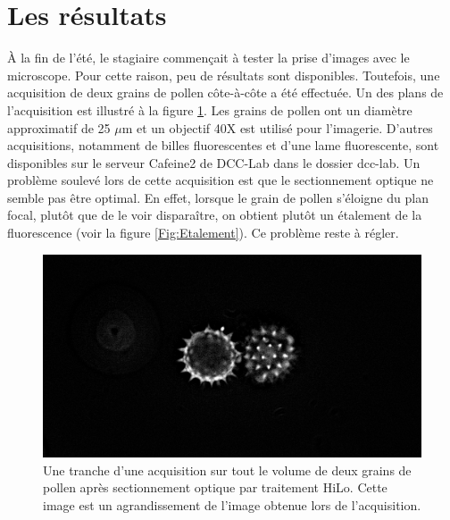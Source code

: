 \documentclass{article}       %
\begin{document}
\section{Les résultats}
\label{Results}

À la fin de l'été, le stagiaire commençait à tester la prise d'images avec le microscope. Pour cette raison, peu de résultats sont disponibles. Toutefois, une acquisition de deux grains de pollen côte-à-côte a été effectuée. Un des plans de l'acquisition est illustré à la figure \ref{Fig:Grains}. Les grains de pollen ont un diamètre approximatif de 25 $\mu$m et un objectif 40X est utilisé pour l'imagerie. D'autres acquisitions, notamment de billes fluorescentes et d'une lame fluorescente, sont disponibles sur le serveur Cafeine2 de DCC-Lab dans le dossier dcc-lab. Un problème soulevé lors de cette acquisition est que le sectionnement optique ne semble pas être optimal. En effet, lorsque le grain de pollen s'éloigne du plan focal, plutôt que de le voir disparaître, on obtient plutôt un étalement de la fluorescence (voir la figure \ref{Fig:Etalement}). Ce problème reste à régler.

\begin{figure}[H]
    \centering
    \includegraphics[scale=0.4]{fig/BeauPollen.PNG}
    \caption{Une tranche d'une acquisition sur tout le volume de deux grains de pollen après sectionnement optique par traitement HiLo. Cette image est un agrandissement de l'image obtenue lors de l'acquisition.}
    \label{Fig:Grains}
\end{figure}
\end{document}
